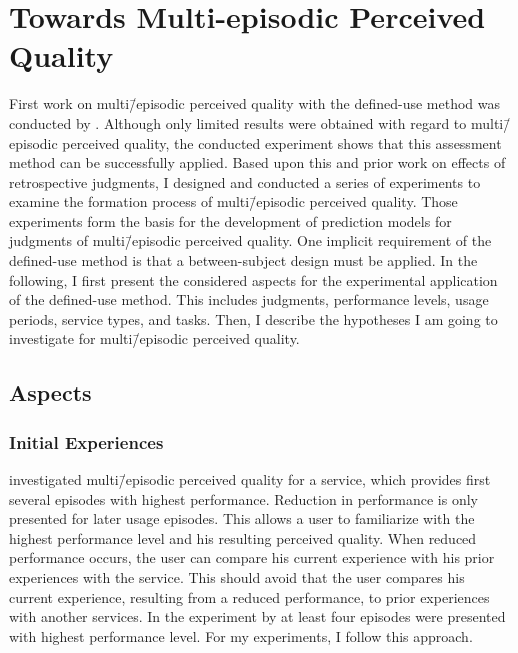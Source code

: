 \chapter{Towards Multi-episodic Perceived Quality}\label{chap:towards}
First work on multi\=/episodic perceived quality with the  defined-use method was conducted by \citet{moller_single-call_2011}.
Although only limited results were obtained with regard to multi\=/episodic perceived quality, the conducted experiment shows that this assessment method can be successfully applied.
Based upon this and prior work on effects of retrospective judgments, I designed and conducted a series of experiments to examine the formation process of multi\=/episodic perceived quality. 
Those experiments form the basis for the development of prediction models for judgments of multi\=/episodic perceived quality.
One implicit requirement of the defined-use method is that a between-subject design must be applied.
In the following, I first present the considered aspects for the experimental application of the defined-use method.
This includes judgments, performance levels, usage periods, service types, and tasks.
Then, I describe the hypotheses I am going to investigate for multi\=/episodic perceived quality.

\section{Aspects}

\subsection{Initial Experiences}
\citet{moller_single-call_2011} investigated multi\=/episodic perceived quality for a service, which provides first several episodes with highest performance.
Reduction in performance is only presented for later usage episodes.
This allows a user to familiarize with the highest performance level and his resulting perceived quality.
When reduced performance occurs, the user can compare his current experience with his prior experiences with the service.
This should avoid that the user compares his current experience, resulting from a reduced performance, to prior experiences with another services.
In the experiment by \citet{moller_single-call_2011} at least four episodes were presented with highest performance level.
For my experiments, I follow this approach.

